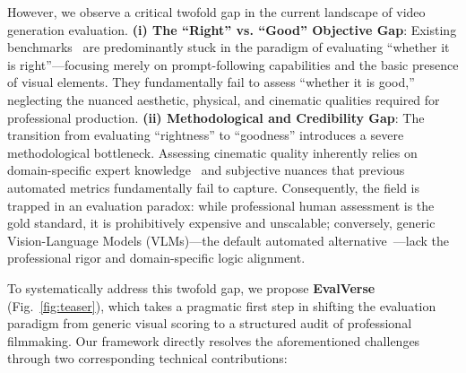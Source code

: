 \documentclass{llmxive}
\begin{document}
However, we observe a critical twofold gap in the current landscape of video generation evaluation. 
\textbf{(i) The ``Right'' vs. ``Good'' Objective Gap}: Existing benchmarks~\cite{evalcrafter,vbench,vbench++,vbench2,univbench} are predominantly stuck in the paradigm of evaluating ``whether it is right''—focusing merely on prompt-following capabilities and the basic presence of visual elements. They fundamentally fail to assess ``whether it is good,'' neglecting the nuanced aesthetic, physical, and cinematic qualities required for professional production. 
\textbf{(ii) Methodological and Credibility Gap}: The transition from evaluating ``rightness'' to ``goodness'' introduces a severe methodological bottleneck. Assessing cinematic quality inherently relies on domain-specific expert knowledge~\cite{vadb} and subjective nuances that previous automated metrics fundamentally fail to capture. Consequently, the field is trapped in an evaluation paradox: while professional human assessment is the gold standard, it is prohibitively expensive and unscalable; conversely, generic Vision-Language Models (VLMs)—the default automated alternative~\cite{datbench}—lack the professional rigor and domain-specific logic alignment.

To systematically address this twofold gap, we propose \textbf{EvalVerse} (Fig.~\ref{fig:teaser}), which takes a pragmatic first step in shifting the evaluation paradigm from generic visual scoring to a structured audit of professional filmmaking. Our framework directly resolves the aforementioned challenges through two corresponding technical contributions:
\end{document}
